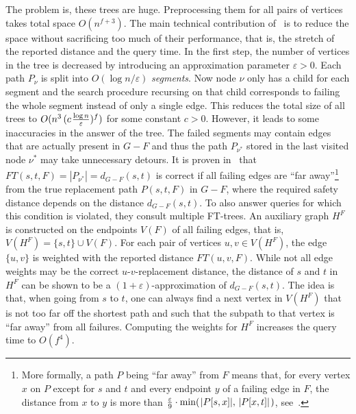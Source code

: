 \documentclass{article}\usepackage[a4paper,margin=20mm]{geometry}
\newcommand*{\nwspace}{\hspace*{.1em}}
\newcommand{\eps}{\varepsilon}
\begin{document}
The problem is, these trees are huge.
Preprocessing them for all pairs of vertices takes total space $O(n^{f+3})$.
The main technical contribution of~\cite{ChCoFiKa17} is to reduce the space without sacrificing too much of their performance,
that is, the stretch of the reported distance and the query time.
%
In the first step, the number of vertices in the tree is decreased
by introducing an approximation parameter $\eps > 0$.
Each path $P_\nu$ is split into $O(\log n/\eps)$ \emph{segments}.
Now node $\nu$ only has a child for each segment and the search procedure recursing 
on that child corresponds to failing the whole segment instead of only a single edge.
This reduces the total size of all trees to $O(n^3 \, (c \nwspace \frac{\log n}{\eps})^f)$
for some constant $c > 0$.
However, it leads to some inaccuracies in the answer of the tree.
The failed segments may contain edges that are actually present in $G-F$
and thus the path $P_{\nu^*}$ stored in the last visited node $\nu^*$ may take unnecessary detours.
It is proven in~\cite{ChCoFiKa17} that $FT(s,t,F) = |P_{\nu^*}| = d_{G-F}(s,t)$
is correct if all failing edges are ``far away''\footnote{%
  More formally, a path $P$ being ``far away'' from $F$ means that,
  for every vertex $x$ on $P$ except for $s$ and $t$ 
  and every endpoint $y$ of a failing edge in $F$,
  the distance from $x$ to $y$ is more than
  $\frac{\eps}{9} \cdot \min(\nwspace |P[s,x]|,\, |P[x,t]| \nwspace )$,
  see~.
}
from the true replacement path $P(s,t,F)$ in $G-F$,
where the required safety distance depends on the distance $d_{G-F}(s,t)$.
To also answer queries for which this condition is violated,
they consult multiple FT-trees.
An auxiliary graph $H^F$ is constructed on the endpoints $V(F)$
of all failing edges, that is, $V(H^F) = \{s,t\} \cup V(F)$.
For each pair of vertices $u,v \in V(H^F)$, the edge $\{u,v\}$ is weighted
with the reported distance $FT(u,v,F)$.
While not all edge weights may be the correct $u$-$v$-replacement distance,
the distance of $s$ and $t$ in $H^F$ can be shown 
to be a $(1{+}\eps)$-approximation of $d_{G-F}(s,t)$.
The idea is that, when going from $s$ to $t$, one can always find a next vertex in $V(H^F)$
that is not too far off the shortest path and
such that the subpath to that vertex is ``far away'' from all failures.
Computing the weights for $H^F$ increases the query time to $O(f^4)$.
\end{document}
